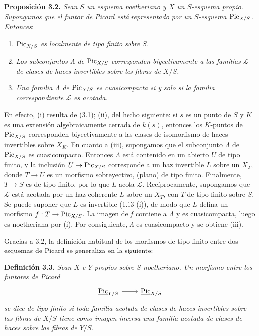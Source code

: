 \textbf{Proposición 3.2.} \emph{Sean \(S\) un esquema noetheriano y \(X\) un
\(S\)-esquema propio. Supongamos que el funtor de Picard está representado
por un \(S\)-esquema \(\operatorname{Pic}_{X/S}\). Entonces}:
\begin{enumerate}[label=(\roman*)]
\item \emph{\(\operatorname{Pic}_{X/S}\) es localmente de tipo finito sobre \(S\).}
\item \emph{Los subconjuntos \(\Lambda\) de \(\operatorname{Pic}_{X/S}\) corresponden
biyectivamente a las familias \(\mathscr L\) de clases de haces invertibles
sobre las fibras de \(X/S\).}
\item \emph{Una familia \(\Lambda\) de \(\operatorname{Pic}_{X/S}\) es cuasicompacta si y
solo si la familia correspondiente \(\mathscr L\) es acotada.}
\end{enumerate}

En efecto, (i) resulta de (3.1); (ii), del hecho siguiente: si \(s\) es un
punto de \(S\) y \(K\) es una extensión algebraicamente cerrada de \(k(s)\),
entonces los \(K\)-puntos de \(\operatorname{Pic}_{X/S}\) corresponden biyectivamente a
las clases de isomorfismo de haces invertibles sobre \(X_K\). En cuanto a
(iii), supongamos que el subconjunto \(\Lambda\) de \(\operatorname{Pic}_{X/S}\) es
cuasicompacto. Entonces \(\Lambda\) está contenido en un abierto \(U\) de
tipo finito, y la inclusión \(U\to\operatorname{Pic}_{X/S}\) corresponde a un haz
invertible \(L\) sobre un \(X_T\), donde \(T\to U\) es un morfismo
sobreyectivo, (plano) de tipo finito. Finalmente, \(T\to S\) es de tipo
finito, por lo que \(L\) acota \(\mathscr L\). Recíprocamente, supongamos que
\(\mathscr L\) está acotada por un haz coherente \(L\) sobre un \(X_T\), con
\(T\) de tipo finito sobre \(S\). Se puede suponer que \(L\) es invertible
(1.13 (i)), de modo que \(L\) defina un morfismo
\(f:T\to\operatorname{Pic}_{X/S}\). La imagen de \(f\) contiene a \(\Lambda\) y es
cuasicompacta, luego es noetheriana por (i). Por consiguiente, \(\Lambda\) es
cuasicompacto y se obtiene (iii).

Gracias a 3.2, la definición habitual de los morfismos de tipo finito entre
dos esquemas de Picard se generaliza en la siguiente:

\textbf{Definición 3.3.} \emph{Sean \(X\) e \(Y\) propios sobre \(S\)
noetheriano. Un morfismo entre los funtores de Picard}
\[
\begin{tikzcd}
\underline{\Pic}_{Y/S}\arrow[r]&\underline{\Pic}_{X/S}
\end{tikzcd}
\]
\emph{se dice de tipo finito si toda familia acotada de clases de haces
invertibles sobre las fibras de \(X/S\) tiene como imagen inversa una familia
acotada de clases de haces sobre las fibras de \(Y/S\).}


